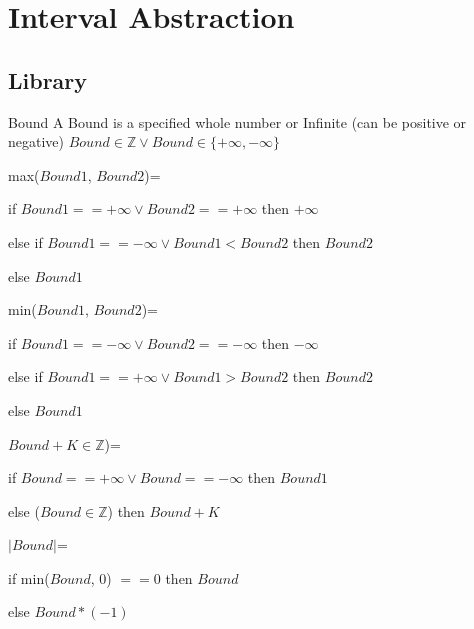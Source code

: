 
\chapter{Interval Abstraction}
\label{sec:intervalabstraction}

\section{Library}

\begin{definition}{Bound}
	A Bound is a specified whole number or Infinite (can be positive or negative) $Bound \in \mathbb{Z} \lor Bound \in \{ +\infty, -\infty \}$
\end{definition}

\begin{definition}{max($Bound1$, $Bound2$)=}

	if $Bound1 == +\infty \lor Bound2 == +\infty$ then $+\infty$
	
	else if $Bound1 == -\infty \lor Bound1<Bound2$ then $Bound2$
	
	else $Bound1$	
\end{definition}

\begin{definition}{min($Bound1$, $Bound2$)=}

if $Bound1 == -\infty \lor Bound2 == -\infty$ then $-\infty$

else if $Bound1 == +\infty \lor Bound1>Bound2$ then $Bound2$

else $Bound1$	
\end{definition}

\begin{definition}{$Bound+K \in \mathbb{Z}$)=}
	
	if $Bound == +\infty \lor Bound == -\infty$ then $Bound1$
	
	else ($Bound \in \mathbb{Z}$) then $Bound+K$
\end{definition}

\begin{definition}{$|Bound|$=}
	
	if min($Bound$, $0$) $==0$ then $Bound$
	
	else $Bound*(-1)$
\end{definition}
	
